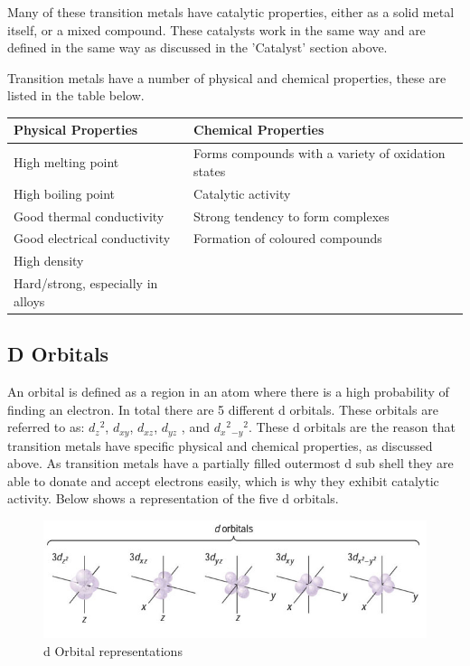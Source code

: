 Many of these transition metals have catalytic properties, either as a solid metal itself, or a mixed compound. These catalysts work in the same way and are defined in the same way as discussed in the 'Catalyst' section above.

Transition metals have a number of physical and chemical properties, these are listed in the table below.

\begin{center}
\begin{tabular}{|l|l|}
    \hline
    \textbf{Physical Properties} & \textbf{Chemical Properties} \\ \hline
High melting point & Forms compounds with a variety of oxidation states \\ \hline
High boiling point & Catalytic activity \\ \hline
Good thermal conductivity & Strong tendency to form complexes \\ \hline
Good electrical conductivity & Formation of coloured compounds \\ \hline
High density & \\ \hline
Hard/strong, especially in alloys & \\ \hline
\end{tabular}

\label{tab:Transition Metal Properties}
\end{center}





	\subsection{D Orbitals}

An orbital is defined as a region in an atom where there is a high probability of finding an electron. In total there are 5 different d orbitals. These orbitals are referred to as: $d_z$$^2$, $d_{xy}$, $d_{xz}$, $d_{yz}$ , and $d_x$$^2$$_{-y}$$^2$. These d orbitals are the reason that transition metals have specific physical and chemical properties, as discussed above. As transition metals have a partially filled outermost d sub shell they are able to donate and accept electrons easily, which is why they exhibit catalytic activity. Below shows a representation of the five d orbitals.


\begin{figure}[H]
    \includegraphics[width=\textwidth]{./Planning/Images/DOrbitals.jpg}
    \caption{d Orbital representations} \label{fig:D Orbitals}
\end{figure}
	

